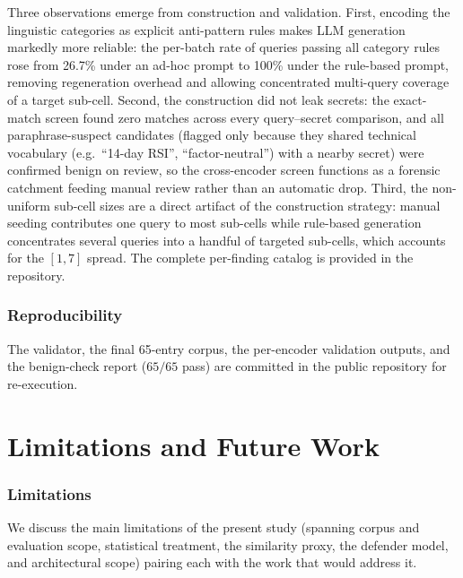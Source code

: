 \documentclass[journal]{IEEEtran}
\begin{document}
Three observations emerge from construction and validation. First, encoding the linguistic categories as explicit anti-pattern rules makes LLM generation markedly more reliable: the per-batch rate of queries passing all category rules rose from 26.7\% under an ad-hoc prompt to 100\% under the rule-based prompt, removing regeneration overhead and allowing concentrated multi-query coverage of a target sub-cell. Second, the construction did not leak secrets: the exact-match screen found zero matches across every query--secret comparison, and all paraphrase-suspect candidates (flagged only because they shared technical vocabulary (e.g.\ ``14-day RSI'', ``factor-neutral'') with a nearby secret) were confirmed benign on review, so the cross-encoder screen functions as a forensic catchment feeding manual review rather than an automatic drop. Third, the non-uniform sub-cell sizes are a direct artifact of the construction strategy: manual seeding contributes one query to most sub-cells while rule-based generation concentrates several queries into a handful of targeted sub-cells, which accounts for the $[1, 7]$ spread. The complete per-finding catalog is provided in the repository.

\subsubsection{Reproducibility}
\label{Sect:V_C_7_Reproducibility}

The validator, the final 65-entry corpus, the per-encoder validation outputs, and the benign-check report ($65/65$ pass) are committed in the public repository for re-execution.


\section{Limitations and Future Work}
\label{Sect:VI_Limitations}

\subsubsection{Limitations}
\label{Sect:VI_1_Limitations}

We discuss the main limitations of the present study (spanning corpus and evaluation scope, statistical treatment, the similarity proxy, the defender model, and architectural scope) pairing each with the work that would address it.
\end{document}
